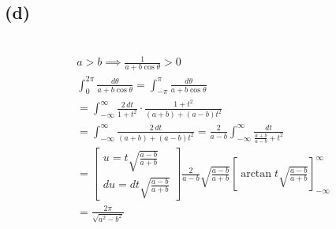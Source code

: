 \documentclass[12pt]{article}
\newcommand{\subproblem}[1]{\subsection{(#1)} \,}
\begin{document}
\subproblem{d}
\begin{gather*}
    a>b \implies \frac{1}{a+b\cos \theta} >0\\
    \int_0^{2\pi} \frac{d\theta}{a+b\cos \theta } =  \int_{-\pi}^\pi \frac{d\theta}{a+b\cos \theta} \\
    = \int_{-\infty}^\infty \frac{2\, dt}{1+t^2} \cdot \frac{1+t^2}{(a+b)+(a-b)t^2}\\
    =\int_{-\infty}^\infty \frac{2\, dt}{(a+b)+(a-b)t^2} = \frac{2}{a-b}\int_{-\infty}^\infty \frac{dt}{\frac{a+b}{a-b}+t^2}\\
    = \begin{bmatrix}
        u=t\sqrt{\frac{a-b}{a+b}} \\
        du=dt\sqrt{\frac{a-b}{a+b}}
    \end{bmatrix}  \frac{2}{a-b} \sqrt{\frac{a-b}{a+b}} \left[ \arctan t\sqrt{\frac{a-b}{a+b}} \right]^\infty_{-\infty}\\
    =\boxed{\frac{2\pi}{\sqrt{a^2-b^2}}} 
\end{gather*}
\end{document}
